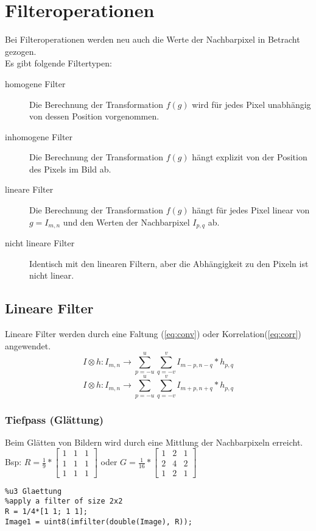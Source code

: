 \section{Filteroperationen}
Bei Filteroperationen werden neu auch die Werte der Nachbarpixel in Betracht gezogen.\\
Es gibt folgende Filtertypen:
\begin{description}
    \item[homogene Filter] Die Berechnung der Transformation $f(g)$ wird für jedes Pixel unabhängig von dessen Position vorgenommen.
    \item[inhomogene Filter] Die Berechnung der Transformation $f(g)$ hängt explizit von der Position des Pixels im Bild ab.
    \item[lineare Filter] Die Berechnung der Transformation $f(g)$ hängt für jedes Pixel linear von $g=I_{m,n}$ und den Werten der Nachbarpixel $I_{p,q}$ ab.
    \item [nicht lineare Filter] Identisch mit den linearen Filtern, aber die Abhängigkeit zu den Pixeln ist nicht linear.
\end{description}

\subsection{Lineare Filter}
Lineare Filter werden durch eine Faltung (\ref{eq:conv}) oder Korrelation(\ref{eq:corr}) angewendet.
\begin{equation} \label{eq:conv}
I \otimes h: I_{m,n} \to \sum_{p=-u}^{u}\sum_{q=-v}^{v}I_{m-p,n-q} * h_{p,q}
\end{equation}
\begin{equation} \label{eq:corr}
I \otimes h: I_{m,n} \to \sum_{p=-u}^{u}\sum_{q=-v}^{v}I_{m+p,n+q} * h_{p,q}
\end{equation}
\subsubsection{Tiefpass (Glättung)}
Beim Glätten von Bildern wird durch eine Mittlung der Nachbarpixeln erreicht.\\
Bsp: $R=\frac{1}{9}*\begin{bmatrix}
1 & 1 & 1 \\
1 & 1 & 1 \\
1 & 1 & 1
\end{bmatrix}$
oder $G=\frac{1}{16}*\begin{bmatrix}
1 & 2 & 1 \\
2 & 4 & 2 \\
1 & 2 & 1
\end{bmatrix}$
\begin{lstlisting}
%u3 Glaettung
%apply a filter of size 2x2
R = 1/4*[1 1; 1 1];
Image1 = uint8(imfilter(double(Image), R));
\end{lstlisting}
